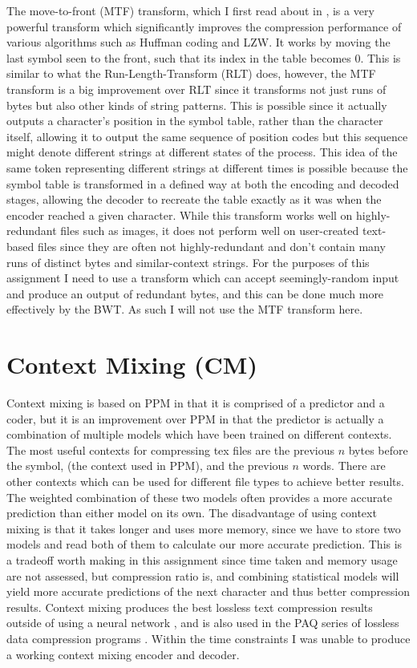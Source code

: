 \documentclass[a4paper, 11pt]{article}
\numberwithin{equation}{section}
\theoremstyle{plain}
\theoremstyle{definition}
\begin{document}
The move-to-front (MTF) transform, which I first read about in \cite{GoogleCompression}, 
is a very powerful transform which significantly improves the compression performance of 
various algorithms such as Huffman coding and LZW. 
It works by moving the last symbol seen to the front, such that its index in the table becomes 0. 
This is similar to what the Run-Length-Transform (RLT) does, however, the MTF transform 
is a big improvement over RLT since it transforms not just runs of bytes but also other kinds of 
string patterns. 
This is possible since it actually outputs a character's position in the symbol table, rather than the 
character itself, allowing it to output the same sequence of position codes but this sequence might denote 
different strings at different states of the process. 
This idea of the same token representing different strings at different times is possible because 
the symbol table is transformed in a defined way at both the encoding and decoded stages, allowing 
the decoder to recreate the table exactly as it was when the encoder reached a given character. 
While this transform works well on highly-redundant files such as images, 
it does not perform well on user-created text-based files since they are often not highly-redundant 
and don't contain many runs of distinct bytes and similar-context strings. 
For the purposes of this assignment I need to use a transform which can accept seemingly-random input 
and produce an output of redundant bytes, and this can be done much more effectively by the BWT. 
As such I will not use the MTF transform here.


\section{Context Mixing (CM)}

Context mixing is based on PPM in that it is comprised of a predictor and a coder, but it is an improvement 
over PPM in that the predictor is actually a combination of multiple models which have been trained on 
different contexts. 
The most useful contexts for compressing tex files are the previous $n$ bytes before the symbol, 
(the context used in PPM), and the previous $n$ words. 
There are other contexts which can be used for different file types to achieve better results. 
The weighted combination of these two models often provides a more accurate prediction than either 
model on its own. 
The disadvantage of using context mixing is that it takes longer and uses more memory, since we have to 
store two models and read both of them to calculate our more accurate prediction. 
This is a tradeoff worth making in this assignment since time taken and memory usage are not assessed, but 
compression ratio is, and combining statistical models will yield more accurate predictions of the next 
character and thus better compression results. 
Context mixing produces the best lossless text compression results outside of using a neural network \cite{TextBenchmark}, 
and is also used in the PAQ series of lossless data compression programs \cite{TextCompression}. 
Within the time constraints I was unable to produce a working context mixing encoder and decoder. 
\end{document}
